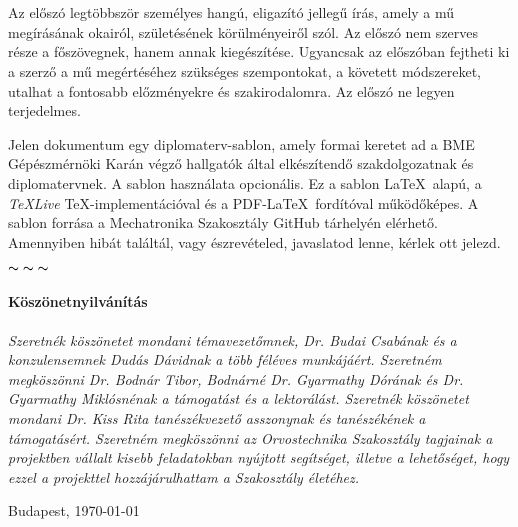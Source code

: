 \chapter*{\eloszo}

Az előszó legtöbbször személyes hangú, eligazító jellegű írás, amely a mű megírásának okairól, születésének körülményeiről szól. Az előszó nem szerves része a főszövegnek, hanem annak kiegészítése.
Ugyancsak az előszóban fejtheti ki a szerző a mű megértéséhez szükséges szempontokat, a követett módszereket, utalhat a fontosabb előzményekre és szakirodalomra.
Az előszó ne legyen terjedelmes.


Jelen dokumentum egy diplomaterv-sablon, amely formai keretet ad a BME Gépészmérnöki Karán végző hallgatók által elkészítendő szakdolgozatnak és diplomatervnek. A sablon használata opcionális. Ez a sablon \LaTeX~alapú, a \emph{TeXLive} \TeX-implementációval és a PDF-\LaTeX~fordítóval működőképes.
A sablon forrása a Mechatronika Szakosztály GitHub tárhelyén\footnotemark{} elérhető. Amennyiben hibát találtál, vagy észrevételed, javaslatod lenne, kérlek ott jelezd.


\begin{center}
    $\thicksim \; \thicksim \; \thicksim$
\end{center}


\subsubsection*{Köszönetnyilvánítás}
\emph{Szeretnék köszönetet mondani témavezetőmnek, Dr. Budai Csabának és a konzulensemnek Dudás Dávidnak a több féléves munkájáért. Szeretném megköszönni Dr. Bodnár Tibor, Bodnárné Dr. Gyarmathy Dórának és Dr. Gyarmathy Miklósnénak a támogatást és a lektorálást. Szeretnék köszönetet mondani Dr. Kiss Rita tanészékvezető asszonynak és tanészékének a támogatásért. Szeretném megköszönni az Orvostechnika Szakosztály tagjainak a projektben vállalt kisebb feladatokban nyújtott segítséget, illetve a lehetőséget, hogy ezzel a projekttel hozzájárulhattam a Szakosztály életéhez.} 


\vspace{0.5cm}

\begin{flushleft}
{Budapest, \today}
\end{flushleft}

\begin{flushright}
\emph{\authorName}
\end{flushright}

\vfill
